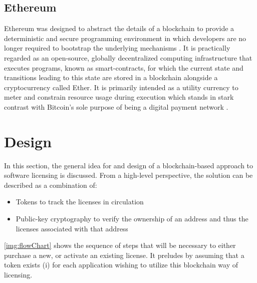 \documentclass{egpubl}
\begin{document}
\subsection{Ethereum}
Ethereum was designed to abstract the details of a blockchain to provide a deterministic and secure programming environment in which developers are no longer required to bootstrap the
underlying mechanisms \cite{10.5555/2695500}. It is practically regarded as an open-source, globally decentralized computing infrastructure that executes programs, known as smart-contracts, for which the current state and transitions leading to this state are stored in a blockchain alongside a cryptocurrency called Ether. It is primarily intended as a utility currency to meter and constrain resource usage during execution which stands in stark contrast with Bitcoin’s sole purpose of being a digital payment network \cite{10.5555/2695500}.


\section{Design}
\label{sec:design}
In this section, the general idea for and design of a blockchain-based approach to software licensing is discussed. From a high-level perspective, the solution can be described as a combination of:

\begin{itemize}
   \item Tokens to track the licenses in circulation
   \item Public-key cryptography to verify the ownership of an address and thus the licenses associated with that address
\end{itemize}

\autoref{img:flowChart} shows the sequence of steps that will be necessary to either purchase a new, or activate an existing license. It preludes by assuming that a token exists (i) for each application wishing to utilize this blockchain way of licensing.
\end{document}
